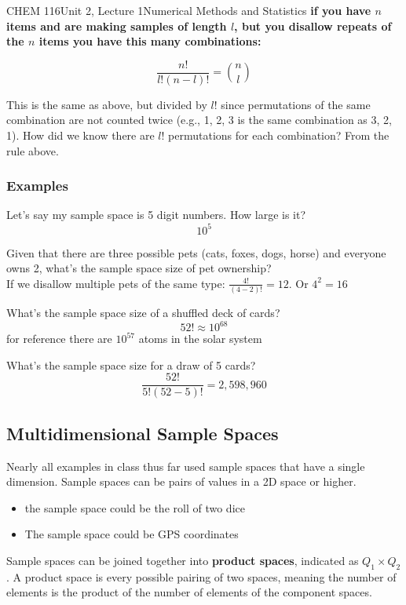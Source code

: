\documentclass{article}
\begin{document}
\begin{tdoc}{CHEM 116}{Unit 2, Lecture 1}{Numerical Methods and Statistics}
  {\bf if you have $n$ items and are making samples of length $l$, but you disallow repeats of the $n$ items you have this many combinations:}

  $$  \frac{n!}{l!(n - l)!} = \binom{n}{l}$$

  This is the same as above, but divided by $l!$ since permutations of
  the same combination are not counted twice (e.g., 1, 2, 3 is the
  same combination as 3, 2, 1). How did we know there are $l!$
  permutations for each combination? From the rule above.

  \subsubsection{Examples}

  Let's say my sample space is 5 digit numbers. How large is it?\\
  $$10^5$$

  Given that there are three possible pets (cats, foxes, dogs, horse)
  and everyone owns 2, what's the sample space size of pet ownership?\\ If
  we disallow multiple pets of the same type: $\frac{4!}{(4 - 2)!} =
  12$. Or $4^2 = 16$

  What's the sample space size of a shuffled deck of cards?\\
  $$52! \approx 10^{68}$$
  for reference there are $10^{57}$ atoms in the solar system

  What's the sample space size for a draw of 5 cards?\\
  $$\frac{52!}{5!(52 - 5)!} = 2,598,960$$
  
  
\subsection{Multidimensional Sample Spaces}

Nearly all examples in class thus far used sample spaces that have a single
dimension. Sample spaces can be pairs of values in a 2D space or
higher. 

\begin{itemize}
\item the sample space could be the roll of two dice
\item The sample space could be GPS coordinates
\end{itemize} 

Sample spaces can be joined together into {\bf product spaces},
indicated as $Q_1\times Q_2$. A product space is every possible
pairing of two spaces, meaning the number of elements is the product
of the number of elements of the component spaces.


\end{tdoc}
\end{document}
